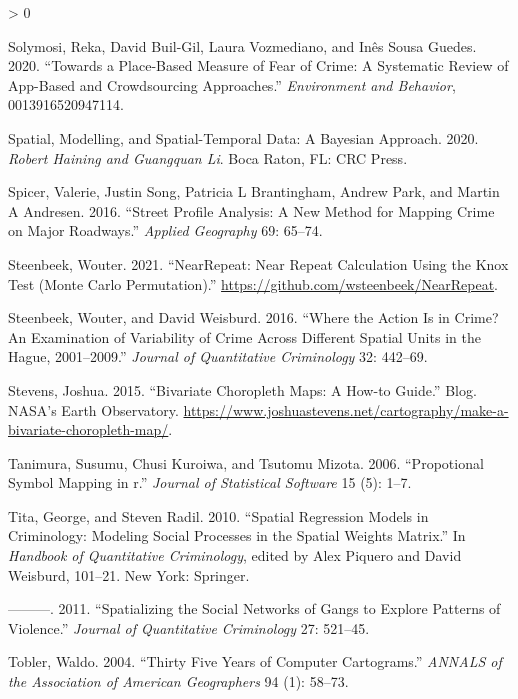 \documentclass[
  krantz2]{krantz}
\newlength{\cslhangindent}
\newenvironment{CSLReferences}[2] %
 {%
  \setlength{\parindent}{0pt}
  \ifodd #1 \everypar{\setlength{\hangindent}{\cslhangindent}}\ignorespaces\fi
  \ifnum #2 > 0
  \setlength{\parskip}{#2\baselineskip}
  \fi
 }%
 {}
\begin{document}
\begin{CSLReferences}{1}{0}
\leavevmode\hypertarget{ref-Solymosi_2020}{}%
Solymosi, Reka, David Buil-Gil, Laura Vozmediano, and Inês Sousa Guedes. 2020. {``Towards a Place-Based Measure of Fear of Crime: A Systematic Review of App-Based and Crowdsourcing Approaches.''} \emph{Environment and Behavior}, 0013916520947114.

\leavevmode\hypertarget{ref-Haining_2020}{}%
Spatial, Modelling, and Spatial-Temporal Data: A Bayesian Approach. 2020. \emph{Robert Haining and Guangquan Li}. Boca Raton, FL: CRC Press.

\leavevmode\hypertarget{ref-Spicer_2016}{}%
Spicer, Valerie, Justin Song, Patricia L Brantingham, Andrew Park, and Martin A Andresen. 2016. {``Street Profile Analysis: A New Method for Mapping Crime on Major Roadways.''} \emph{Applied Geography} 69: 65--74.

\leavevmode\hypertarget{ref-Steenbeek_2021}{}%
Steenbeek, Wouter. 2021. {``NearRepeat: Near Repeat Calculation Using the Knox Test (Monte Carlo Permutation).''} \url{https://github.com/wsteenbeek/NearRepeat}.

\leavevmode\hypertarget{ref-Steenbeek_2016}{}%
Steenbeek, Wouter, and David Weisburd. 2016. {``Where the Action Is in Crime? An Examination of Variability of Crime Across Different Spatial Units in the Hague, 2001--2009.''} \emph{Journal of Quantitative Criminology} 32: 442--69.

\leavevmode\hypertarget{ref-Stevens_2015}{}%
Stevens, Joshua. 2015. {``Bivariate Choropleth Maps: A How-to Guide.''} Blog. NASA's Earth Observatory. \url{https://www.joshuastevens.net/cartography/make-a-bivariate-choropleth-map/}.

\leavevmode\hypertarget{ref-Tanimura_2006}{}%
Tanimura, Susumu, Chusi Kuroiwa, and Tsutomu Mizota. 2006. {``Propotional Symbol Mapping in r.''} \emph{Journal of Statistical Software} 15 (5): 1--7.

\leavevmode\hypertarget{ref-Tita_2010}{}%
Tita, George, and Steven Radil. 2010. {``Spatial Regression Models in Criminology: Modeling Social Processes in the Spatial Weights Matrix.''} In \emph{Handbook of Quantitative Criminology}, edited by Alex Piquero and David Weisburd, 101--21. New York: Springer.

\leavevmode\hypertarget{ref-Tita_2011}{}%
---------. 2011. {``Spatializing the Social Networks of Gangs to Explore Patterns of Violence.''} \emph{Journal of Quantitative Criminology} 27: 521--45.

\leavevmode\hypertarget{ref-Tobler_2004}{}%
Tobler, Waldo. 2004. {``Thirty Five Years of Computer Cartograms.''} \emph{ANNALS of the Association of American Geographers} 94 (1): 58--73.


\end{CSLReferences}
\end{document}
